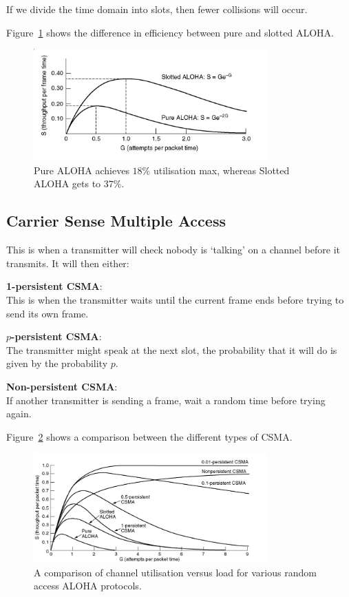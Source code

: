 If we divide the time domain into slots, then fewer collisions will occur.


Figure~\ref{aloha-comp} shows the difference in efficiency between pure and
slotted ALOHA.

\begin{figure}
  \centering
  \includegraphics[width=0.8\textwidth]{images/aloha-comp}
  \caption{Pure ALOHA achieves $18\%$ utilisation max, whereas Slotted ALOHA
  \label{aloha-comp}
  gets to $37\%$.}
\end{figure}

\subsection{Carrier Sense Multiple Access}

This is when a transmitter will check nobody is `talking' on a channel before it
transmits. It will then either:

\begin{description}
  \item \textbf{1-persistent CSMA}:\\
    This is when the transmitter waits until the current frame ends before
    trying to send its own frame.
  \item \textbf{$p$-persistent CSMA}:\\
    The transmitter might speak at the next slot, the probability that it will
    do is given by the probability $p$.
  \item \textbf{Non-persistent CSMA}:\\
    If another transmitter is sending a frame, wait a random time before trying
    again.
\end{description}

Figure~\ref{aloha-rates} shows a comparison between the different types of CSMA.

\begin{figure}[ht]
  \centering
  \includegraphics[width=0.8\textwidth]{images/aloha-rates}
  \caption{A comparison of channel utilisation versus load for various random
  access ALOHA protocols.}
  \label{aloha-rates}
\end{figure}

